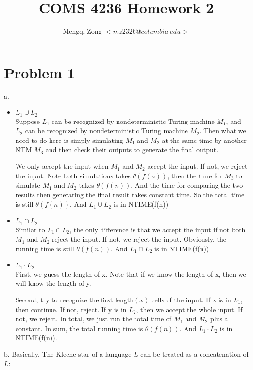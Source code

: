 \documentclass[12pt]{article}
\title{COMS 4236 Homework 2}
\author{Mengqi Zong $<mz2326@columbia.edu>$}
\begin{document}
\maketitle

\setlength{\parindent}{0in}

\section*{Problem 1}

a.
\begin{itemize}
\item $L_1 \cup L_2$ \\
  Suppose $L_1$ can be recognized by nondeterministic Turing machine
  $M_1$, and $L_2$ can be recognized by nondeterministic Turing
  machine $M_2$. Then what we need to do here is simply simulating
  $M_1$ and $M_2$ at the same time by another NTM $M_3$ and then check
  their outputs to generate the final output.

  We only accept the input when $M_1$ and $M_2$ accept the input. If
  not, we reject the input. Note both simulations takes
  $\theta(f(n))$, then the time for $M_3$ to simulate $M_1$ and $M_2$
  takes $\theta(f(n))$. And the time for comparing the two results then
  generating the final result takes constant time. So the total time
  is still $\theta(f(n))$. And $L_1 \cup L_2$ is in NTIME(f(n)).
\item $L_1 \cap L_2$ \\
  Similar to $L_1 \cap L_2$, the only difference is that we accept the
  input if not both $M_1$ and $M_2$ reject the input. If not, we
  reject the input. Obviously, the running time is still
  $\theta(f(n))$. And $L_1 \cap L_2$ is in NTIME(f(n))
\item $L_1 \cdot L_2$ \\
  First, we guess the length of x. Note that if we know the length of
  x, then we will know the length of y.

  Second, try to recognize the first length$(x)$ cells of the
  input. If x is in $L_1$, then continue. If not, reject. If y is in
  $L_2$, then we accept the whole input. If not, we reject. In total, we
  just run the total time of $M_1$ and $M_2$ plus a constant. In sum,
  the total running time is $\theta(f(n))$. And $L_1 \cdot L_2$ is in
  NTIME(f(n)). 
\end{itemize}

b. Basically, The Kleene star of a language $L$ can be treated as a
concatenation of $L$:
\end{document}
